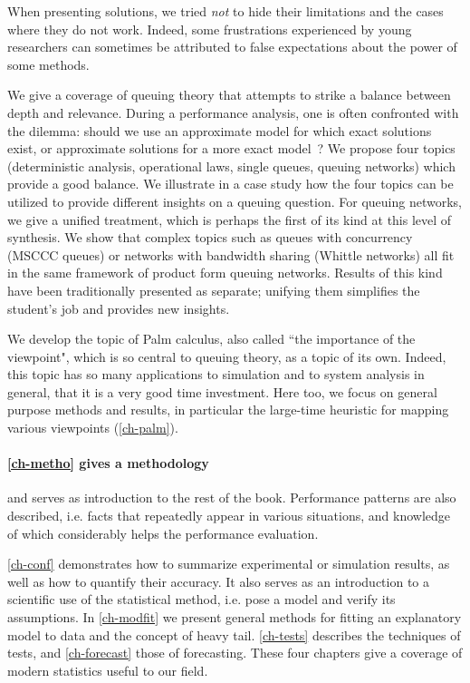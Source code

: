 When presenting solutions, we tried \emph{not} to hide their
limitations and the cases where they do not work. Indeed, some
frustrations experienced by young researchers can sometimes be
attributed to false expectations about the power of some
methods.

We give a coverage of queuing theory that attempts to strike a
balance between depth and relevance. During a performance
analysis, one is often confronted with the dilemma: should we
use an approximate model for which exact solutions exist, or
approximate solutions for a more exact model~?
We propose four topics (deterministic analysis, operational
laws, single queues, queuing networks) which provide a good
balance. We illustrate in a case study how the four topics can
be utilized to provide different insights on a queuing question.
For queuing networks, we give a unified treatment, which is
perhaps the first of its kind at this level of synthesis. We
show that complex topics such as queues with concurrency (MSCCC
queues) or networks with bandwidth sharing (Whittle networks)
all fit in the same framework of product form queuing networks.
Results of this kind have been traditionally presented as
separate; unifying them simplifies the student's job and
provides new insights.

We develop the topic of Palm calculus, also called ``the
importance of the viewpoint", which is so central to queuing
theory, as a topic of its own. Indeed, this topic has so many
applications to simulation and to system analysis in general,
that it is a very good time investment. Here too, we focus on
general purpose methods and results, in particular the
large-time heuristic for mapping various viewpoints
(\cref{ch-palm}).

\paragraph{\cref{ch-metho} gives a methodology} and serves
as introduction to the rest of the book.
Performance patterns are also described, i.e.
facts that repeatedly appear in various
situations, and knowledge of which considerably
helps the performance evaluation.

\cref{ch-conf} demonstrates how to summarize
experimental or simulation results, as well as how to
quantify their accuracy. It also serves as an
introduction to a scientific use of the
statistical method, i.e. pose a model and verify
its assumptions. In \cref{ch-modfit} we present
general methods for fitting an explanatory model
to data and the concept of heavy tail.
\cref{ch-tests} describes the techniques of
tests, and \cref{ch-forecast} those of forecasting.
These four chapters give a coverage of modern
statistics useful to our field.

